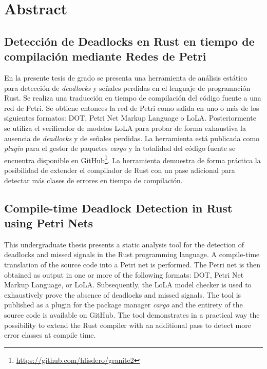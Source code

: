 \clearpage
{}
\chapter*{\centering Abstract}

\section*{Detección de Deadlocks en Rust en tiempo de compilación mediante Redes de Petri}

En la presente tesis de grado se presenta una herramienta de análisis estático
para detección de \textit{deadlocks} y señales perdidas en el lenguaje de programación Rust.
Se realiza una traducción en tiempo de compilación del código fuente a una red de Petri.
Se obtiene entonces la red de Petri como salida en uno o más de los siguientes formatos:
DOT, Petri Net Markup Language o LoLA.
Posteriormente se utiliza el verificador de modelos LoLA
para probar de forma exhaustiva la ausencia de \textit{deadlocks} y de señales perdidas.
La herramienta está publicada como \textit{plugin} para el gestor de paquetes \textit{cargo}
y la totalidad del código fuente se encuentra disponible
en GitHub\footnote[1]{\url{https://github.com/hlisdero/granite2}}.
La herramienta demuestra de forma práctica la posibilidad
de extender el compilador de Rust con un pase adicional para
detectar más clases de errores en tiempo de compilación.

\section*{Compile-time Deadlock Detection in Rust using Petri Nets}

This undergraduate thesis presents a static analysis tool
for the detection of deadlocks and missed signals in the Rust programming language.
A compile-time translation of the source code into a Petri net is performed.
The Petri net is then obtained as output in one or more of the following formats:
DOT, Petri Net Markup Language, or LoLA.
Subsequently, the LoLA model checker is used
to exhaustively prove the absence of deadlocks and missed signals.
The tool is published as a plugin for the package manager \textit{cargo} and
the entirety of the source code is available on GitHub\footnotemark[1].
The tool demonstrates in a practical way the possibility
to extend the Rust compiler with an additional pass
to detect more error classes at compile time.
